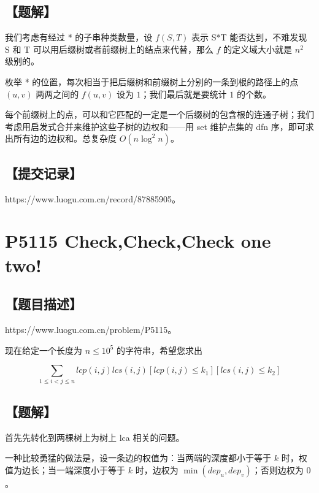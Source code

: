 \documentclass[UTF8,12pt,a4paper]{ctexart}
\begin{document}
	\subsection*{【题解】}
	
	我们考虑有经过 * 的子串种类数量，设 $f(S,T)$ 表示 S*T 能否达到，不难发现 S 和 T 可以用后缀树或者前缀树上的结点来代替，那么 $f$ 的定义域大小就是 $n^2$ 级别的。
	
	枚举 * 的位置，每次相当于把后缀树和前缀树上分别的一条到根的路径上的点 $(u,v)$ 两两之间的 $f(u,v)$ 设为 $1$；我们最后就是要统计 $1$ 的个数。
	
	每个前缀树上的点，可以和它匹配的一定是一个后缀树的包含根的连通子树；我们考虑用启发式合并来维护这些子树的边权和——用 set 维护点集的 dfn 序，即可求出所有边的边权和。总复杂度 $O(n\log^2n)$。
	
	
	\subsection*{【提交记录】}
	
	https://www.luogu.com.cn/record/87885905。
	
	
	\section*{P5115 Check,Check,Check one two!}
	
	\subsection*{【题目描述】}
	
	https://www.luogu.com.cn/problem/P5115。
	
	现在给定一个长度为 $n\le 10^5$ 的字符串，希望您求出
	
	$$\sum_{1\leq i < j \leq n}lcp(i,j)lcs(i,j)[lcp(i,j)\leq k_1][lcs(i,j) \leq k_2]$$
	
	\subsection*{【题解】}
	
	首先先转化到两棵树上为树上 lca 相关的问题。
	
	一种比较勇猛的做法是，设一条边的权值为：当两端的深度都小于等于 $k$ 时，权值为边长；当一端深度小于等于 $k$ 时，边权为 $\min(dep_u,dep_v)$；否则边权为 $0$。
	
\end{document}
